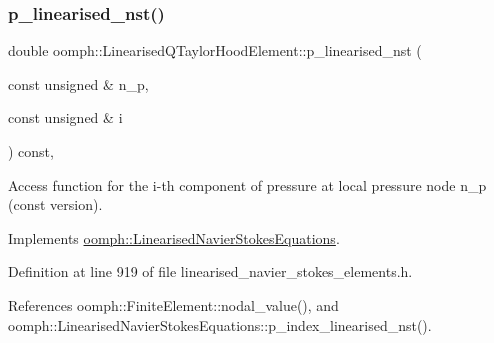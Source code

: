 \mbox{\label{classoomph_1_1LinearisedQTaylorHoodElement_a9f8724c0006b99cf422040d429033828}} 
\subsubsection{\texorpdfstring{p\+\_\+linearised\+\_\+nst()}{p\_linearised\_nst()}}
{\footnotesize\ttfamily double oomph\+::\+Linearised\+Q\+Taylor\+Hood\+Element\+::p\+\_\+linearised\+\_\+nst (\begin{DoxyParamCaption}\item[{const unsigned \&}]{n\+\_\+p,  }\item[{const unsigned \&}]{i }\end{DoxyParamCaption}) const\hspace{0.3cm}{\ttfamily [inline]}, {\ttfamily [virtual]}}



Access function for the i-\/th component of pressure at local pressure node n\+\_\+p (const version). 



Implements \hyperlink{classoomph_1_1LinearisedNavierStokesEquations_a7c3449ddb70e11667cb8926db5ce1174}{oomph\+::\+Linearised\+Navier\+Stokes\+Equations}.



Definition at line 919 of file linearised\+\_\+navier\+\_\+stokes\+\_\+elements.\+h.



References oomph\+::\+Finite\+Element\+::nodal\+\_\+value(), and oomph\+::\+Linearised\+Navier\+Stokes\+Equations\+::p\+\_\+index\+\_\+linearised\+\_\+nst().

\mbox{\label{classoomph_1_1LinearisedQTaylorHoodElement_add790a7adf9472c27b4da3c0f6c9e4a5}} 
